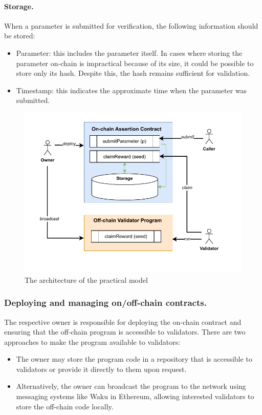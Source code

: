 \documentclass[runningheads]{llncs}
\begin{document}
\paragraph{Storage.}
When a parameter is submitted for verification, the following information should be stored:
\begin{itemize}
\item Parameter: this includes the parameter itself. In cases where storing the parameter on-chain is impractical because of its size, it could be possible to store only its hash. Despite this, the hash remains sufficient for validation.
\item Timestamp: this indicates the approximate time when the parameter was submitted.
\end{itemize}
\begin{figure}
\centering
\includegraphics[scale=.8]{assertion1}
\caption{The architecture of the practical model}
\label{fig.architect}
\end{figure}
\subsubsection{Deploying and managing on/off-chain contracts.}
The respective owner is responsible for deploying the on-chain contract and ensuring that the off-chain program is accessible to validators. There are two approaches to make the program available to validators:
\begin{itemize}
   \item The owner may store the program code in a repository that is accessible to validators or provide it directly to them upon request. 	\item Alternatively, the owner can broadcast the program to the network using messaging systems like Waku in Ethereum, allowing interested validators to store the off-chain code locally.
\end{itemize}
\end{document}
